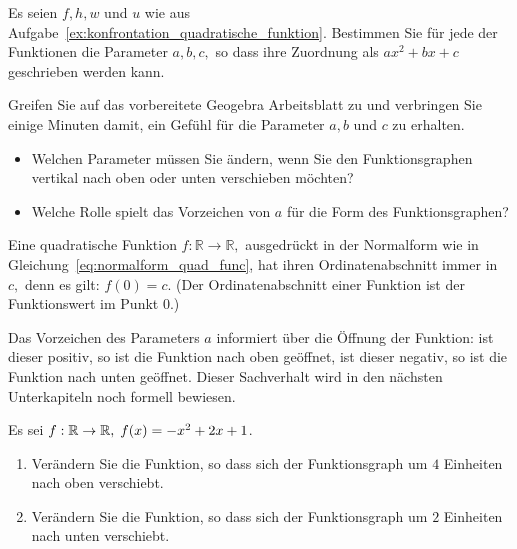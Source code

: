 \documentclass[12pt]{article}
\begin{document}
\begin{exercise}
Es seien $f, h, w$ und $u$ wie aus Aufgabe~\ref{ex:konfrontation_quadratische_funktion}. Bestimmen Sie für jede der Funktionen die Parameter $a,b,c,$ so dass ihre Zuordnung als $ax^2 + bx + c$ geschrieben werden kann.
\end{exercise}

\begin{exercise}
Greifen Sie auf das vorbereitete Geogebra Arbeitsblatt zu und verbringen Sie einige Minuten damit, ein Gefühl für die Parameter $a,b$ und $c$ zu erhalten.
\begin{itemize}
\item Welchen Parameter müssen Sie ändern, wenn Sie den Funktionsgraphen vertikal nach oben oder unten verschieben möchten?
\item Welche Rolle spielt das Vorzeichen von $a$ für die Form des Funktionsgraphen?
\end{itemize}
\end{exercise}
\begin{remark}
Eine quadratische Funktion $f: \mathbb{R} \rightarrow \mathbb{R},$ ausgedrückt in der Normalform wie in Gleichung~\ref{eq:normalform_quad_func}, hat ihren Ordinatenabschnitt immer in $c,$ denn es gilt: $f(0) = c$. (Der Ordinatenabschnitt einer Funktion ist der Funktionswert im Punkt $0$.)

Das Vorzeichen des Parameters $a$ informiert über die Öffnung der Funktion: ist dieser positiv, so ist die Funktion nach oben geöffnet, ist dieser negativ, so ist die Funktion nach unten geöffnet. Dieser Sachverhalt wird in den nächsten Unterkapiteln noch formell bewiesen.
\end{remark}

\begin{exercise}
Es sei $f: \mathbb{R} \rightarrow \mathbb{R}, \; f(x) = -x^2 + 2x + 1$.
\begin{enumerate}
\item Verändern Sie die Funktion, so dass sich der Funktionsgraph um $4$ Einheiten nach oben verschiebt.
\item Verändern Sie die Funktion, so dass sich der Funktionsgraph um $2$ Einheiten nach unten verschiebt.
\end{enumerate}
\end{exercise}
%
\newpage
\end{document}
